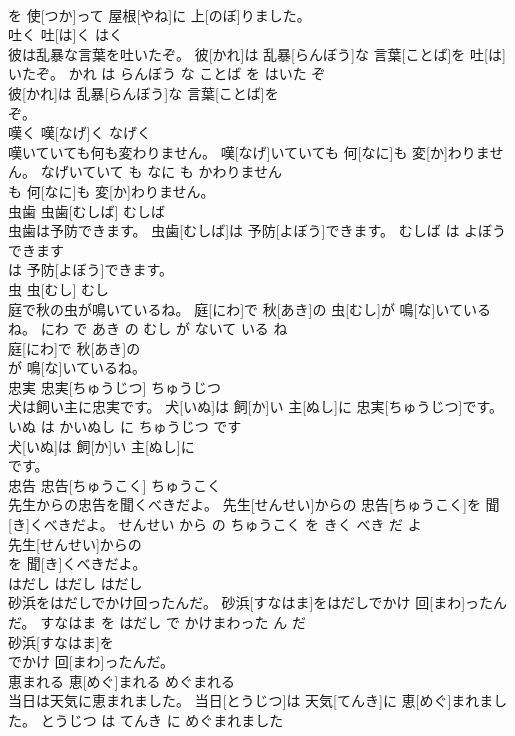 \documentclass[8pt]{extreport}
\begin{document}
\begin{CJK}{UTF8}{min}
\\	を 使[つか]って 屋根[やね]に 上[のぼ]りました。			
\\	吐く	吐[は]く	はく	
\\	彼は乱暴な言葉を吐いたぞ。	彼[かれ]は 乱暴[らんぼう]な 言葉[ことば]を 吐[は]いたぞ。	かれ は らんぼう な ことば を はいた ぞ	
\\	彼[かれ]は 乱暴[らんぼう]な 言葉[ことば]を
\\	ぞ。			
\\	嘆く	嘆[なげ]く	なげく	
\\	嘆いていても何も変わりません。	嘆[なげ]いていても 何[なに]も 変[か]わりません。	なげいていて も なに も かわりません	
\\	も 何[なに]も 変[か]わりません。			
\\	虫歯	虫歯[むしば]	むしば	
\\	虫歯は予防できます。	虫歯[むしば]は 予防[よぼう]できます。	むしば は よぼう できます	
\\	は 予防[よぼう]できます。			
\\	虫	虫[むし]	むし	
\\	庭で秋の虫が鳴いているね。	庭[にわ]で 秋[あき]の 虫[むし]が 鳴[な]いているね。	にわ で あき の むし が ないて いる ね	
\\	庭[にわ]で 秋[あき]の
\\	が 鳴[な]いているね。			
\\	忠実	忠実[ちゅうじつ]	ちゅうじつ	
\\	犬は飼い主に忠実です。	犬[いぬ]は 飼[か]い 主[ぬし]に 忠実[ちゅうじつ]です。	いぬ は かいぬし に ちゅうじつ です	
\\	犬[いぬ]は 飼[か]い 主[ぬし]に
\\	です。			
\\	忠告	忠告[ちゅうこく]	ちゅうこく	
\\	先生からの忠告を聞くべきだよ。	先生[せんせい]からの 忠告[ちゅうこく]を 聞[き]くべきだよ。	せんせい から の ちゅうこく を きく べき だ よ	
\\	先生[せんせい]からの
\\	を 聞[き]くべきだよ。			
\\	はだし	はだし	はだし	
\\	砂浜をはだしでかけ回ったんだ。	砂浜[すなはま]をはだしでかけ 回[まわ]ったんだ。	すなはま を はだし で かけまわった ん だ	
\\	砂浜[すなはま]を
\\	でかけ 回[まわ]ったんだ。			
\\	恵まれる	恵[めぐ]まれる	めぐまれる	
\\	当日は天気に恵まれました。	当日[とうじつ]は 天気[てんき]に 恵[めぐ]まれました。	とうじつ は てんき に めぐまれました	

\end{CJK}
\end{document}
